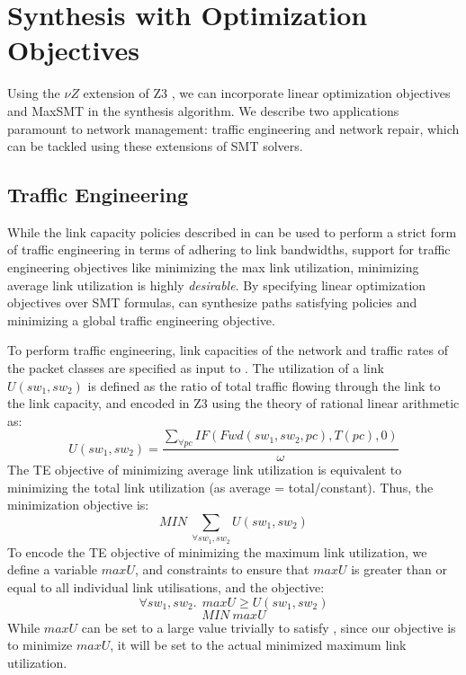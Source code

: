 \section{Synthesis with Optimization Objectives}
Using the $\nu Z$ extension of Z3 \cite{nuz3}, we can incorporate 
linear optimization
objectives and MaxSMT in the synthesis algorithm. 
We describe two applications paramount to network management:
traffic engineering and network repair, which can be tackled using
these extensions of SMT solvers.
\subsection{Traffic Engineering}
While the link capacity policies described in  can
be used to perform a strict form of traffic engineering in terms of 
adhering to link bandwidths, support for traffic engineering objectives
like minimizing the max link utilization, minimizing average link utilization
is highly \emph{desirable}. By specifying linear optimization objectives over
SMT formulas, \name can synthesize paths satisfying policies and minimizing
a global traffic engineering objective. 

To perform traffic engineering, link capacities of the network and traffic 
rates of the packet classes are specified as input to \name. The utilization 
of a link $U(sw_1, sw_2)$ is defined as the ratio of total traffic flowing through the link to the 
link capacity, and encoded in Z3 using the theory of rational linear arithmetic as:
\begin{equation}
U(sw_1, sw_2) = \frac{\sum_{\forall pc} IF(Fwd(sw_1,sw_2, pc), T(pc), 0)} {\omega}
\end{equation}
The TE objective of minimizing average link utilization is equivalent to minimizing
the total link utilization (as average = total/constant). Thus, the minimization
objective is:
\begin{equation}
	MIN\ \sum_{\forall sw_1, sw_2} U(sw_1, sw_2)
\end{equation}
To encode the TE objective of minimizing the maximum link utilization, we define
a variable $maxU$, and constraints to ensure that $maxU$ is greater than or equal to all 
individual link utilisations, and the objective: 
\begin{equation} \label{eq:maxu}
\forall sw_1, sw_2.\ \ maxU \geq U(sw_1, sw_2)
\end{equation} 
\begin{equation}
	MIN\ maxU
\end{equation}
While $maxU$ can be set to a large value trivially to satisfy 
, since our objective is to minimize $maxU$, it will be set to the actual
minimized maximum link utilization. 

